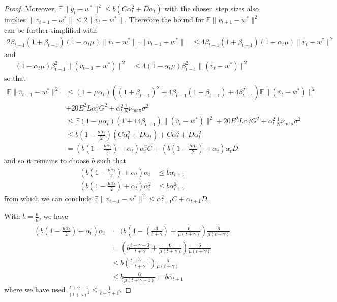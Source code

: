 \begin{proof}
Moreover, $\mathbb{E}\|\overline{y}_{t}-w^{\ast}\|^{2}\leq b(C\alpha_{t}^{2}+D\alpha_{t})$
with the chosen step sizes also implies $\|\overline{v}_{t-1}-w^{\ast}\|\leq2\|\overline{v}_{t}-w^{\ast}\|$.
Therefore the bound for $\mathbb{E}\|\overline{v}_{t+1}-w^{\ast}\|^{2}$
can be further simplified with 
\begin{align*}
2\beta_{t-1}(1+\beta_{t-1})(1-\alpha_{t}\mu)\|\overline{v}_{t}-w^{\ast}\|\cdot\|\overline{v}_{t-1}-w^{\ast}\| & \leq4\beta_{t-1}(1+\beta_{t-1})(1-\alpha_{t}\mu)\|\overline{v}_{t}-w^{\ast}\|^{2}
\end{align*}
and 
\begin{align*}
(1-\alpha_{t}\mu)\beta_{t-1}^{2}\|(\overline{v}_{t-1}-w^{\ast})\|^{2} & \leq4(1-\alpha_{t}\mu)\beta_{t-1}^{2}\|(\overline{v}_{t}-w^{\ast})\|^{2}
\end{align*}
so that
\begin{align*}
\mathbb{E}\|\overline{v}_{t+1}-w^{\ast}\|^{2} & \leq(1-\mu\alpha_{t})((1+\beta_{t-1})^{2}+4\beta_{t-1}(1+\beta_{t-1})+4\beta_{t-1}^{2})\mathbb{E}\|(\overline{v}_{t}-w^{\ast})\|^{2}\\
& +20E^{2}L\alpha_{t}^{3}G^{2}+\alpha_{t}^{2}\frac{1}{N}\nu_{\max}\sigma^{2}\\
& \leq\mathbb{E}(1-\mu\alpha_{t})(1+14\beta_{t-1})\|(\overline{v}_{t}-w^{\ast})\|^{2}+20E^{2}L\alpha_{t}^{3}G^{2}+\alpha_{t}^{2}\frac{1}{N}\nu_{\max}\sigma^{2}\\
& \leq b(1-\frac{\mu\alpha_{t}}{2})(C\alpha_{t}^{2}+D\alpha_{t})+C\alpha_{t}^{3}+D\alpha_{t}^{2}\\
& =(b(1-\frac{\mu\alpha_{t}}{2})+\alpha_{t})\alpha_{t}^{2}C+(b(1-\frac{\mu\alpha_{t}}{2})+\alpha_{t})\alpha_{t}D
\end{align*}
and so it remains to choose $b$ such that 
\begin{align*}
(b(1-\frac{\mu\alpha_{t}}{2})+\alpha_{t})\alpha_{t} & \leq b\alpha_{t+1}\\
(b(1-\frac{\mu\alpha_{t}}{2})+\alpha_{t})\alpha_{t}^{2} & \leq b\alpha_{t+1}^{2}
\end{align*}
from which we can conclude $\mathbb{E}\|\overline{v}_{t+1}-w^{\ast}\|^{2}\leq\alpha_{t+1}^{2}C+\alpha_{t+1}D$.

With $b=\frac{6}{\mu}$, we have
\begin{align*}
(b(1-\frac{\mu\alpha_{t}}{2})+\alpha_{t})\alpha_{t} & =(b(1-(\frac{3}{t+\gamma})+\frac{6}{\mu(t+\gamma)})\frac{6}{\mu(t+\gamma)}\\
& =(b\frac{t+\gamma-3}{t+\gamma}+\frac{6}{\mu(t+\gamma)})\frac{6}{\mu(t+\gamma)}\\
& \leq b(\frac{t+\gamma-1}{t+\gamma})\frac{6}{\mu(t+\gamma)}\\
& \leq b\frac{6}{\mu(t+\gamma+1)}=b\alpha_{t+1}
\end{align*}
where we have used $\frac{t+\gamma-1}{(t+\gamma)^{2}}\leq\frac{1}{t+\gamma+1}$.


\end{proof}
